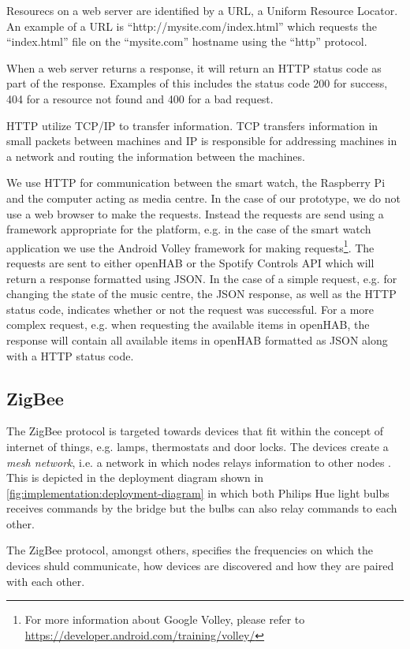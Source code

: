 Resourecs on a web server are identified by a URL, a Uniform Resource Locator. An example of a URL is ``http://mysite.com/index.html'' which requests the ``index.html'' file on the ``mysite.com'' hostname using the ``http'' protocol.

When a web server returns a response, it will return an HTTP status code as part of the response. Examples of this includes the status code 200 for success, 404 for a resource not found and 400 for a bad request.

HTTP utilize TCP/IP to transfer information. TCP transfers information in small packets between machines and IP is responsible for addressing machines in a network and routing the information between the machines.

We use HTTP for communication between the smart watch, the Raspberry Pi and the computer acting as media centre. In the case of our prototype, we do not use a web browser to make the requests. Instead the requests are send using a framework appropriate for the platform, e.g. in the case of the smart watch application we use the Android Volley framework for making requests\footnote{For more information about Google Volley, please refer to \url{https://developer.android.com/training/volley/}}.
The requests are sent to either openHAB or the Spotify Controls API which will return a response formatted using JSON. In the case of a simple request, e.g. for changing the state of the music centre, the JSON response, as well as the HTTP status code, indicates whether or not the request was successful. For a more complex request, e.g. when requesting the available items in openHAB, the response will contain all available items in openHAB formatted as JSON along with a HTTP status code.

\subsection{ZigBee}

The ZigBee protocol is targeted towards devices that fit within the concept of internet of things, e.g. lamps, thermostats and door locks. The devices create a \emph{mesh network}, i.e. a network in which nodes relays information to other nodes \cite{zigbee:zigbee-pro}. This is depicted in the deployment diagram shown in \cref{fig:implementation:deployment-diagram} in which both Philips Hue light bulbs receives commands by the bridge but the bulbs can also relay commands to each other.

The ZigBee protocol, amongst others, specifies the frequencies on which the devices shuld communicate, how devices are discovered and how they are paired with each other.

